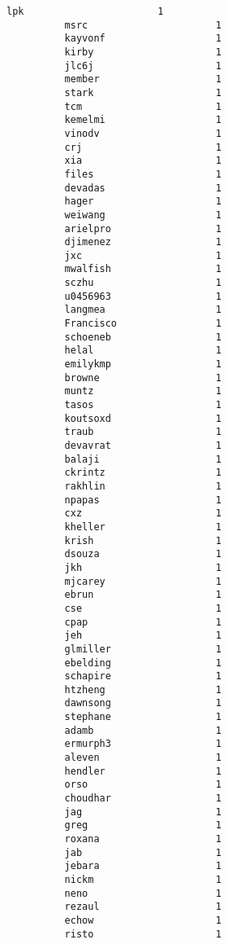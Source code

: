 \documentclass[11pt]{article}
\begin{document}
\begin{Verbatim}[commandchars=\\\{\}]
          lpk                       1
          msrc                      1
          kayvonf                   1
          kirby                     1
          jlc6j                     1
          member                    1
          stark                     1
          tcm                       1
          kemelmi                   1
          vinodv                    1
          crj                       1
          xia                       1
          files                     1
          devadas                   1
          hager                     1
          weiwang                   1
          arielpro                  1
          djimenez                  1
          jxc                       1
          mwalfish                  1
          sczhu                     1
          u0456963                  1
          langmea                   1
          Francisco                 1
          schoeneb                  1
          helal                     1
          emilykmp                  1
          browne                    1
          muntz                     1
          tasos                     1
          koutsoxd                  1
          traub                     1
          devavrat                  1
          balaji                    1
          ckrintz                   1
          rakhlin                   1
          npapas                    1
          cxz                       1
          kheller                   1
          krish                     1
          dsouza                    1
          jkh                       1
          mjcarey                   1
          ebrun                     1
          cse                       1
          cpap                      1
          jeh                       1
          glmiller                  1
          ebelding                  1
          schapire                  1
          htzheng                   1
          dawnsong                  1
          stephane                  1
          adamb                     1
          ermurph3                  1
          aleven                    1
          hendler                   1
          orso                      1
          choudhar                  1
          jag                       1
          greg                      1
          roxana                    1
          jab                       1
          jebara                    1
          nickm                     1
          neno                      1
          rezaul                    1
          echow                     1
          risto                     1

\end{Verbatim}
\end{document}
